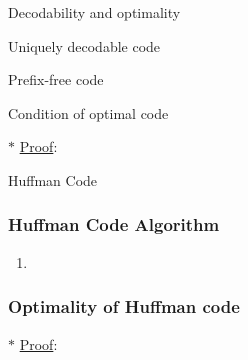 \documentclass[9pt]{beamer}
\begin{document}
    \begin{section}{Decodability and optimality}
        \begin{frame}{Uniquely decodable code}
            \begin{definition}
                
            \end{definition}
        \end{frame}

        \begin{frame}{Prefix-free code}
            \begin{definition}
                
            \end{definition}
        \end{frame}

        \begin{frame}{Condition of optimal code}
            \begin{lemma}
                
            \end{lemma}
            \begin{lemma}
                
            \end{lemma}
            \begin{lemma}
                
            \end{lemma}
            \vspace{0.2cm}
            $\ast$ \underline{Proof}:
        \end{frame}
    \end{section}

    \begin{section}{Huffman Code}
        \begin{frame}
            \frametitle{Huffman Code Algorithm}
            \begin{enumerate}
                \item 
            \end{enumerate}
        \end{frame}

        \begin{frame}
            \frametitle{Optimality of Huffman code}
            \begin{lemma}
            
            \end{lemma}
            
            \vspace{0.2cm}
            $\ast$ \underline{Proof}:
        \end{frame}
    \end{section}
\end{document}
